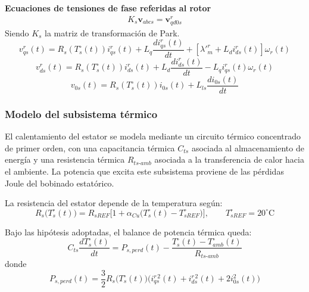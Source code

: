 \documentclass[12pt, a4paper,journal, onecolumn, compsoc]{IEEEtran}
\begin{document}
\textbf{Ecuaciones de tensiones de fase referidas al rotor}
    \begin{align}
        K_s\textbf{v}_{abcs} = \textbf{v}^r_{qd0s}
    \end{align}
    Siendo \(K_s\) la matriz de transformación de Park.
    \begin{equation}\label{eq:vqs_rotor}
        v^r_{qs}(t)=R_s(T_s^\circ(t))i^r_{qs}(t) + L_q\frac{d i^r_{qs}(t)}{dt}+[\lambda'^r_m + L_d i^r_{ds}(t)]\omega_r(t)
    \end{equation}
    \begin{equation}\label{eq:vds_rotor}
        v_{ds}^r(t)=R_s(T_s^\circ(t))i^r_{ds}(t)+L_d\frac{d i^r_{ds}(t)}{dt} - L_qi^r_{qs}(t)\omega_r(t)
    \end{equation}
    \begin{equation}\label{eq:v0s_rotor}
        v_{0s}(t)=R_s(T_s^\circ(t))i_{0s}(t)+L_{ls}\frac{d i_{0s}(t)}{dt}
    \end{equation}

    \subsubsection{Modelo del subsistema térmico}
    El calentamiento del estator se modela mediante un circuito térmico concentrado de primer orden, con una capacitancia térmica \(C_{ts}\) asociada al almacenamiento de energía y una resistencia térmica \(R_{ts\text{-}amb}\) asociada a la transferencia de calor hacia el ambiente. La potencia que excita este subsistema proviene de las pérdidas Joule del bobinado estatórico.

    La resistencia del estator depende de la temperatura según:
    \begin{equation}
        R_s\big(T_s^\circ(t)\big)=R_{sREF}\Big[1+\alpha_{Cu}\big(T_s^\circ(t)-T_{sREF}^\circ\big)\Big], \qquad T_{sREF}^\circ=20^\circ\text{C}
    \end{equation}

    Bajo las hipótesis adoptadas, el balance de potencia térmica queda:
    \begin{equation}
        C_{ts}\frac{dT_s^\circ(t)}{dt}=P_{s,perd}(t)-\frac{T_s^\circ(t)-T_{amb}^\circ(t)}{R_{ts\text{-}amb}}
    \end{equation}
    donde
    \begin{equation}
        P_{s,perd}(t)=\frac{3}{2}R_s\big(T_s^\circ(t)\big)\Big(i_{qs}^{r\,2}(t)+i_{ds}^{r\,2}(t)+2i_{0s}^{2}(t)\Big)
    \end{equation}
\end{document}
